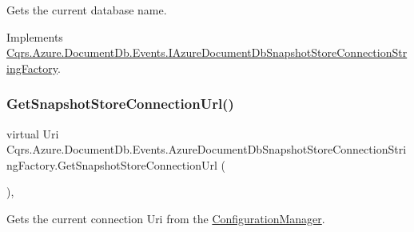 Gets the current database name. 



Implements \hyperlink{interfaceCqrs_1_1Azure_1_1DocumentDb_1_1Events_1_1IAzureDocumentDbSnapshotStoreConnectionStringFactory_a1a6c06eeccfae14bcacae499972a4bcf_a1a6c06eeccfae14bcacae499972a4bcf}{Cqrs.\+Azure.\+Document\+Db.\+Events.\+I\+Azure\+Document\+Db\+Snapshot\+Store\+Connection\+String\+Factory}.

\mbox{\label{classCqrs_1_1Azure_1_1DocumentDb_1_1Events_1_1AzureDocumentDbSnapshotStoreConnectionStringFactory_a024f98c6d21a39c190a6af7da942b3c1_a024f98c6d21a39c190a6af7da942b3c1}} 
\subsubsection{\texorpdfstring{Get\+Snapshot\+Store\+Connection\+Url()}{GetSnapshotStoreConnectionUrl()}}
{\footnotesize\ttfamily virtual Uri Cqrs.\+Azure.\+Document\+Db.\+Events.\+Azure\+Document\+Db\+Snapshot\+Store\+Connection\+String\+Factory.\+Get\+Snapshot\+Store\+Connection\+Url (\begin{DoxyParamCaption}{ }\end{DoxyParamCaption})\hspace{0.3cm}{\ttfamily [protected]}, {\ttfamily [virtual]}}



Gets the current connection Uri from the \hyperlink{namespaceCqrs_1_1Azure_1_1ConfigurationManager}{Configuration\+Manager}. 



